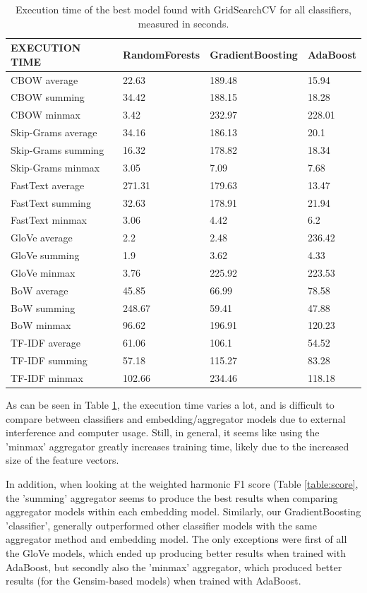 \begin{table}
\centering
\begin{tabular}{|l|lll|}
\hline
\textbf{EXECUTION TIME} & RandomForests & GradientBoosting & AdaBoost \\ \hline
CBOW average & 22.63 & 189.48 & 15.94 \\
CBOW summing & 34.42 & 188.15 & 18.28 \\
CBOW minmax & 3.42 & 232.97 & 228.01 \\ \hline
Skip-Grams average & 34.16 & 186.13 & 20.1 \\
Skip-Grams summing & 16.32 & 178.82 & 18.34 \\
Skip-Grams minmax & 3.05 & 7.09 & 7.68 \\ \hline
FastText average & 271.31 & 179.63 & 13.47 \\
FastText summing & 32.63 & 178.91 & 21.94 \\
FastText minmax & 3.06 & 4.42 & 6.2 \\ \hline
GloVe average & 2.2 & 2.48 & 236.42 \\
GloVe summing & 1.9 & 3.62 & 4.33 \\
GloVe minmax & 3.76 & 225.92 & 223.53 \\ \hline
BoW average & 45.85 & 66.99 & 78.58 \\
BoW summing & 248.67 & 59.41 & 47.88 \\
BoW minmax & 96.62 & 196.91 & 120.23 \\ \hline
TF-IDF average & 61.06 & 106.1 & 54.52 \\
TF-IDF summing & 57.18 & 115.27 & 83.28 \\
TF-IDF minmax & 102.66 & 234.46 & 118.18 \\ \hline
\end{tabular}
\caption{Execution time of the best model found with GridSearchCV for all classifiers, measured in seconds.}
\label{table:execution_time}
\end{table}

As can be seen in Table \ref{table:execution_time}, the execution time varies a lot, and is difficult to compare between classifiers and embedding/aggregator models due to external interference and computer usage. Still, in general, it seems like using the 'minmax' aggregator greatly increases training time, likely due to the increased size of the feature vectors.

In addition, when looking at the weighted harmonic F1 score (Table \ref{table:score}, the 'summing' aggregator seems to produce the best results when comparing aggregator models within each embedding model. Similarly, our GradientBoosting 'classifier', generally outperformed other classifier models with the same aggregator method and embedding model. The only exceptions were first of all the GloVe models, which ended up producing better results when trained with AdaBoost, but secondly also the 'minmax' aggregator, which produced better results (for the Gensim-based models) when trained with AdaBoost.

